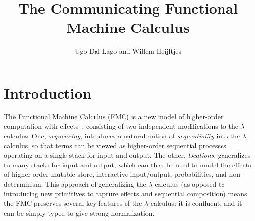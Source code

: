 \documentclass{article}
\title{The Communicating Functional Machine Calculus}
\author{Ugo Dal Lago and Willem Heijltjes}
\theoremstyle{definition}
\theoremstyle{plain}
\begin{document}
\maketitle





%




\section{Introduction}

The Functional Machine Calculus (FMC) is a new model of higher-order computation with effects~\cite{}, consisting of two independent modifications to the $\lambda$-calculus. One, \emph{sequencing}, introduces a natural notion of \emph{sequentiality} into the $\lambda$-calculus, so that terms can be viewed as higher-order sequential processes operating on a single stack for input and output. The other, \emph{locations}, generalizes to many stacks for input and output, which can then be used to model the effects of higher-order mutable store, interactive input/output, probabilities, and non-determinism. This approach of generalizing the $\lambda$-calculus (as opposed to introducing new primitives to capture effects and sequential composition) means the FMC preserves several key features of the $\lambda$-calculus: it is confluent, and it can be simply typed to give strong normalization.
\end{document}
